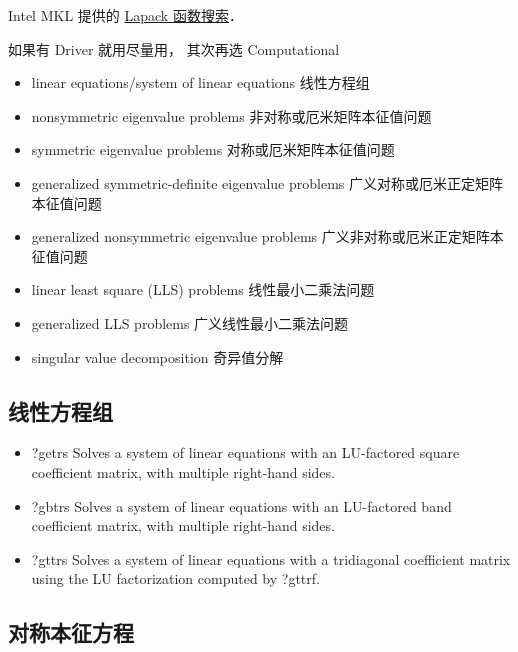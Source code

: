 
\begin{issues}
\issueDraft
\end{issues}


Intel MKL 提供的 \href{https://www.intel.com/content/www/us/en/developer/tools/oneapi/onemkl-function-finding-advisor.html}{Lapack 函数搜索}．

如果有 Driver 就用尽量用， 其次再选 Computational

\begin{itemize}
\item linear equations/system of linear equations 线性方程组
\item nonsymmetric eigenvalue problems 非对称或厄米矩阵本征值问题
\item symmetric eigenvalue problems 对称或厄米矩阵本征值问题
\item generalized symmetric-definite eigenvalue problems 广义对称或厄米正定矩阵本征值问题
\item generalized nonsymmetric eigenvalue problems 广义非对称或厄米正定矩阵本征值问题
\item linear least square (LLS) problems 线性最小二乘法问题
\item generalized LLS problems 广义线性最小二乘法问题
\item singular value decomposition 奇异值分解
\end{itemize}

\subsection{线性方程组}
\begin{itemize}
\item ?getrs Solves a system of linear equations with an LU-factored square coefficient matrix, with multiple right-hand sides.
\item ?gbtrs Solves a system of linear equations with an LU-factored band coefficient matrix, with multiple right-hand sides.
\item ?gttrs Solves a system of linear equations with a tridiagonal coefficient matrix using the LU factorization computed by ?gttrf.
\end{itemize}


\subsection{对称本征方程}
